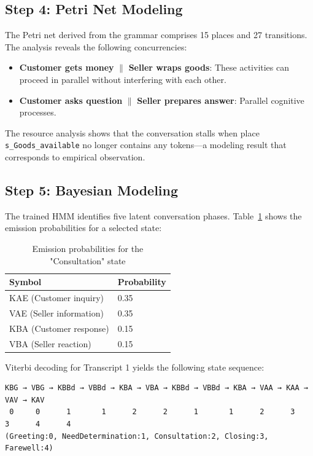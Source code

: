 \documentclass[12pt,a4paper]{article}
\begin{document}
\subsection{Step 4: Petri Net Modeling}

The Petri net derived from the grammar comprises 15 places and 27 transitions. The analysis reveals the following concurrencies:

\begin{itemize}
    \item \textbf{Customer gets money} $\parallel$ \textbf{Seller wraps goods}: These activities can proceed in parallel without interfering with each other.
    \item \textbf{Customer asks question} $\parallel$ \textbf{Seller prepares answer}: Parallel cognitive processes.
\end{itemize}

The resource analysis shows that the conversation stalls when place \texttt{s\_Goods\_available} no longer contains any tokens—a modeling result that corresponds to empirical observation.

\subsection{Step 5: Bayesian Modeling}

The trained HMM identifies five latent conversation phases. Table~\ref{tab:hmm} shows the emission probabilities for a selected state:

\begin{table}[H]
\centering
\caption{Emission probabilities for the "Consultation" state}
\label{tab:hmm}
\begin{tabular}{@{} l l @{}}
\toprule
\textbf{Symbol} & \textbf{Probability} \\
\midrule
KAE (Customer inquiry) & 0.35 \\
VAE (Seller information) & 0.35 \\
KBA (Customer response) & 0.15 \\
VBA (Seller reaction) & 0.15 \\
\bottomrule
\end{tabular}
\end{table}

Viterbi decoding for Transcript 1 yields the following state sequence:

\begin{verbatim}
KBG → VBG → KBBd → VBBd → KBA → VBA → KBBd → VBBd → KBA → VAA → KAA → VAV → KAV
 0     0      1       1      2      2      1       1      2      3      3      4      4
(Greeting:0, NeedDetermination:1, Consultation:2, Closing:3, Farewell:4)
\end{verbatim}
\end{document}

